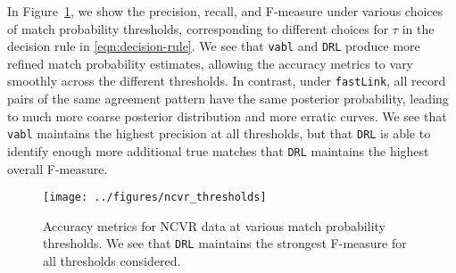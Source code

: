 \documentclass[12pt,letterpaper]{article}
\newcommand{\1}[1]{\mathbb{I}\!\left[#1\right]} %
\begin{document}
In Figure~\ref{fig:ncvr_thresholds}, we show the precision, recall, and F-measure under various choices of match probability thresholds, corresponding to different choices for $\tau$ in the decision rule in \eqref{eqn:decision-rule}. We see that \texttt{vabl} and \texttt{DRL} produce more refined match probability estimates, allowing the accuracy metrics to vary smoothly across the different thresholds. In contrast, under \texttt{fastLink}, all record pairs of the same agreement pattern have the same posterior probability, leading to much more coarse posterior distribution and more erratic curves. We see that \texttt{vabl} maintains the highest precision at all thresholds, but that \texttt{DRL} is able to identify enough more additional true matches that \texttt{DRL} maintains the highest overall F-measure.
\begin{figure}[t]
	\centering
	\texttt{[image: ../figures/ncvr\_thresholds]}
	\caption{Accuracy metrics for NCVR data at various match probability thresholds. We see that \texttt{DRL} maintains the strongest F-measure for all thresholds considered.}
	\label{fig:ncvr_thresholds}
\end{figure}



\end{document}
